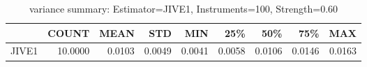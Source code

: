 \begin{table}[ht]
\centering
\caption{variance summary: Estimator=JIVE1, Instruments=100, Strength=0.60}
\begin{tabular}{lrrrrrrrr}
\toprule
 & COUNT & MEAN & STD & MIN & 25\% & 50\% & 75\% & MAX \\
\midrule
JIVE1 & 10.0000 & 0.0103 & 0.0049 & 0.0041 & 0.0058 & 0.0106 & 0.0146 & 0.0163 \\
\bottomrule
\end{tabular}
\end{table}
